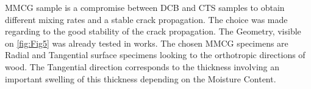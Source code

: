 \documentclass[3p,times,procedia]{elsarticle}
\begin{document}
MMCG sample is a compromise between DCB and CTS samples to obtain different mixing rates and a stable crack propagation. The choice was made regarding to the good stability of the crack propagation. The Geometry, visible on \ref{fig:Fig5} was already tested in \cite{Reference7} works. The chosen MMCG specimens are Radial and Tangential surface specimens looking to the orthotropic directions of wood. The Tangential direction corresponds to the thickness involving an important swelling of this thickness depending on the Moisture Content.





\end{document}
